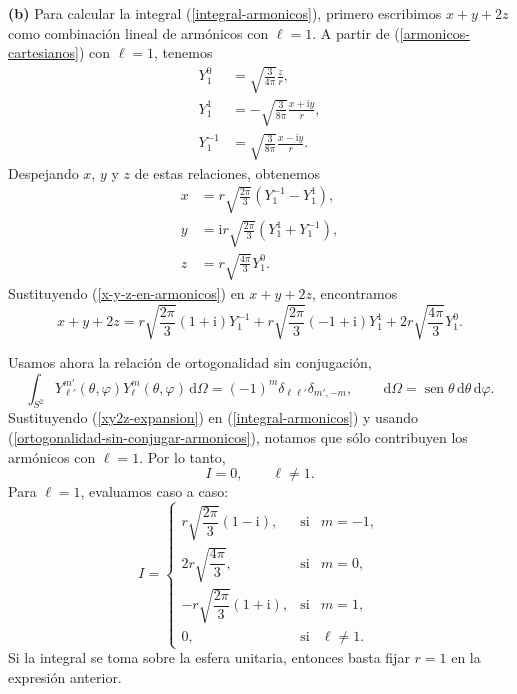 \documentclass[11pt]{article}
\newcommand{\inciso}[1]{%
\vspace{0.35em}
\noindent\textbf{(#1)}\enspace}
\newcommand{\dd}{\,\mathrm{d}}
\newcommand{\ii}{\mathrm{i}}
\newcommand{\sen}{\operatorname{sen}}
\begin{document}
\inciso{b} Para calcular la integral (\ref{integral-armonicos}), primero escribimos $x+y+2z$ como combinación lineal de armónicos con $\ell=1$. A partir de (\ref{armonicos-cartesianos}) con $\ell=1$, tenemos
\begin{align*}
Y_1^0&=\sqrt{\frac{3}{4\pi}}\frac{z}{r},\\
Y_1^1&=-\sqrt{\frac{3}{8\pi}}\frac{x+\ii y}{r},\\
Y_1^{-1}&=\sqrt{\frac{3}{8\pi}}\frac{x-\ii y}{r}.
\end{align*}
Despejando $x$, $y$ y $z$ de estas relaciones, obtenemos
\begin{align}
\label{x-y-z-en-armonicos}
x&=r\sqrt{\frac{2\pi}{3}}\left(Y_1^{-1}-Y_1^1\right),\\
y&=\ii r\sqrt{\frac{2\pi}{3}}\left(Y_1^1+Y_1^{-1}\right),\\
z&=r\sqrt{\frac{4\pi}{3}}Y_1^0.
\end{align}
Sustituyendo (\ref{x-y-z-en-armonicos}) en $x+y+2z$, encontramos
\begin{equation}
\label{xy2z-expansion}
x+y+2z
=r\sqrt{\frac{2\pi}{3}}(1+\ii)Y_1^{-1}
+r\sqrt{\frac{2\pi}{3}}(-1+\ii)Y_1^1
+2r\sqrt{\frac{4\pi}{3}}Y_1^0.
\end{equation}

Usamos ahora la relación de ortogonalidad sin conjugación,
\begin{equation}
\label{ortogonalidad-sin-conjugar-armonicos}
\int_{S^2}Y_{\ell'}^{m'}(\theta,\varphi)Y_\ell^m(\theta,\varphi)\dd\Omega
=(-1)^m\delta_{\ell\ell'}\delta_{m',-m},
\qquad
\dd\Omega=\sen\theta\dd\theta\dd\varphi.
\end{equation}
Sustituyendo (\ref{xy2z-expansion}) en (\ref{integral-armonicos}) y usando (\ref{ortogonalidad-sin-conjugar-armonicos}), notamos que sólo contribuyen los armónicos con $\ell=1$. Por lo tanto,
\begin{equation*}
I=0,
\qquad \ell\neq1.
\end{equation*}
Para $\ell=1$, evaluamos caso a caso:
\begin{equation*}
I=
\left\{
\begin{array}{lcc}
r\sqrt{\dfrac{2\pi}{3}}(1-\ii), & \text{si} & m=-1,\\[0.8em]
2r\sqrt{\dfrac{4\pi}{3}}, & \text{si} & m=0,\\[0.8em]
-r\sqrt{\dfrac{2\pi}{3}}(1+\ii), & \text{si} & m=1,\\[0.8em]
0, & \text{si} & \ell\neq1.
\end{array}
\right.
\end{equation*}
Si la integral se toma sobre la esfera unitaria, entonces basta fijar $r=1$ en la expresión anterior.
\end{document}
